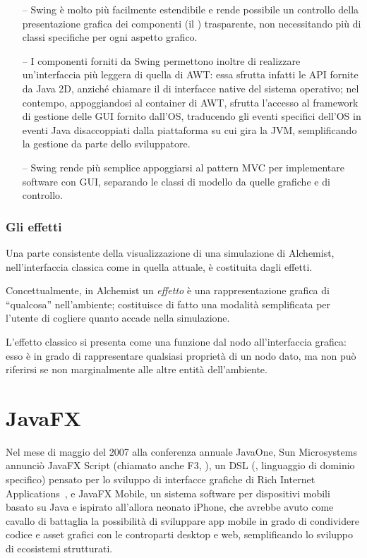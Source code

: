                 \begin{itemize}
                    \item[--] Swing è molto più facilmente estendibile e rende possibile un controllo della presentazione grafica dei componenti (il ) trasparente, non necessitando più di classi specifiche per ogni aspetto grafico.

                    \item[--] I componenti forniti da Swing permettono inoltre di realizzare un'interfaccia più leggera di quella di AWT: essa sfrutta infatti le API fornite da Java 2D, anziché chiamare il  di interfacce native del sistema operativo; nel contempo, appoggiandosi al container di AWT, sfrutta l'accesso al framework di gestione delle GUI fornito dall'OS, traducendo gli eventi specifici dell'OS in eventi Java disaccoppiati dalla piattaforma su cui gira la JVM, semplificando la gestione da parte dello sviluppatore.

                    \item[--] Swing rende più semplice appoggiarsi al pattern MVC per implementare software con GUI, separando le classi di modello da quelle grafiche e di controllo.

                \end{itemize}

            \subsubsection{Gli effetti}\label{subsub:effect}
                Una parte consistente della visualizzazione di una simulazione di Alchemist, nell'interfaccia classica come in quella attuale, è costituita dagli effetti.

                Concettualmente, in Alchemist un \emph{effetto} è una rappresentazione grafica di ``qualcosa'' nell'ambiente; costituisce di fatto una modalità semplificata per l'utente di cogliere quanto accade nella simulazione.

                L'effetto classico si presenta  come una funzione dal nodo all'interfaccia grafica: esso è in grado di rappresentare qualsiasi proprietà di un nodo dato, ma non può riferirsi se non marginalmente alle altre entità dell'ambiente.

    \section{JavaFX}\label{sec:jfx}
        Nel mese di maggio del 2007 alla conferenza annuale JavaOne, Sun Microsystems annunciò JavaFX Script (chiamato anche F3, ), un DSL (, linguaggio di dominio specifico) pensato per lo sviluppo di interfacce grafiche di Rich Internet Applications~\cite{moritz2008rich}, e JavaFX Mobile, un sistema software per dispositivi mobili basato su Java e ispirato all'allora neonato iPhone, che avrebbe avuto come cavallo di battaglia la possibilità di sviluppare app mobile in grado di condividere codice e asset grafici con le controparti desktop e web, semplificando lo sviluppo di ecosistemi strutturati.

